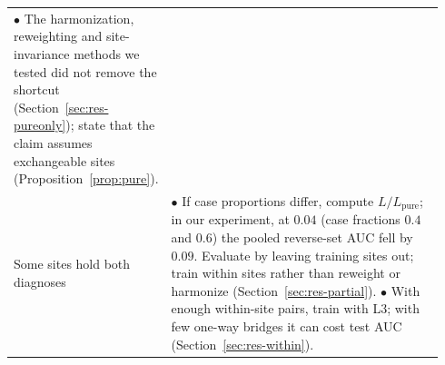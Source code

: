 \begin{table}[tbp]
{\begin{minipage}{15cm}
\begin{tabular}{>{\raggedright}p{0.2\linewidth}>{\raggedright\arraybackslash}p{0.74\linewidth}}
$\bullet$ The harmonization, reweighting and site-invariance methods we tested did not remove the shortcut (Section~\ref{sec:res-pureonly}); state that the claim assumes exchangeable sites (Proposition~\ref{prop:pure}).\\
\addlinespace
Some sites hold both diagnoses &
$\bullet$ If case proportions differ, compute $L/L_{\mathrm{pure}}$; in our experiment, at $0.04$ (case fractions $0.4$ and $0.6$) the pooled reverse-set AUC fell by $0.09$. Evaluate by leaving training sites out; train within sites rather than reweight or harmonize (Section~\ref{sec:res-partial}).\newline
$\bullet$ With enough within-site pairs, train with L3; with few one-way bridges it can cost test AUC (Section~\ref{sec:res-within}).\\
\bottomrule
\end{tabular}
\end{minipage}}
\end{table}
